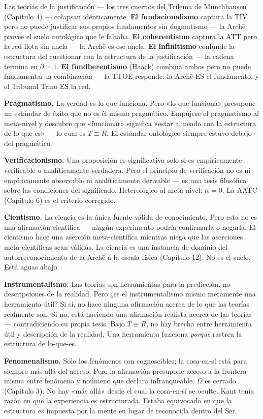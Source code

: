 \documentclass[10pt, openany, oneside]{book}
\begin{document}
Las teorías de la justificación --- los tres cuernos del Trilema de M\"{u}nchhausen (Capítulo 4) --- colapsan idénticamente. \textbf{El fundacionalismo} captura la TIV pero no puede justificar sus propios fundamentos sin dogmatismo --- la Arch\={e} provee el suelo autológico que le faltaba. \textbf{El coherentismo} captura la ATT pero la red flota sin ancla --- la Arch\={e} es ese ancla. \textbf{El infinitismo} confunde la estructura del cuestionar con la estructura de la justificación --- la cadena termina en $\partial = 1$. \textbf{El fundherentismo} (Haack) combina ambos pero no puede fundamentar la combinación --- la TTOE responde: la Arch\={e} ES el fundamento, y el Tribunal Trino ES la red.

\textbf{Pragmatismo.} La verdad es lo que funciona. Pero «lo que funciona» presupone un estándar de éxito que no es él mismo pragmático. Empújese el pragmatismo al meta-nivel y descubre que «funcionar» significa «estar alineado con la estructura de lo-que-es» --- lo cual es $T \equiv R$. El estándar ontológico siempre estuvo debajo del pragmático.

\textbf{Verificacionismo.} Una proposición es significativa solo si es empíricamente verificable o analíticamente verdadera. Pero el principio de verificación no es ni empíricamente observable ni analíticamente derivable --- es una tesis filosófica sobre las condiciones del significado. Heterológico al meta-nivel: $\alpha = 0$. La AATC (Capítulo 6) es el criterio corregido.

\textbf{Cientismo.} La ciencia es la única fuente válida de conocimiento. Pero esta no es una afirmación científica --- ningún experimento podría confirmarla o negarla. El cientismo hace una aserción meta-científica mientras niega que las aserciones meta-científicas sean válidas. La ciencia es una instancia de dominio del autorreconocimiento de la Arch\={e} a la escala física (Capítulo 12). No es el suelo. Está aguas abajo.

\textbf{Instrumentalismo.} Las teorías son herramientas para la predicción, no descripciones de la realidad. Pero ¿es el instrumentalismo mismo meramente una herramienta útil? Si sí, no hace ninguna afirmación acerca de lo que las teorías realmente son. Si no, está haciendo una afirmación realista acerca de las teorías --- contradiciendo su propia tesis. Bajo $T \equiv R$, no hay brecha entre herramienta útil y descripción de la realidad. Una herramienta funciona \textit{porque} rastrea la estructura de lo-que-es.

\textbf{Fenomenalismo.} Solo los fenómenos son cognoscibles; la cosa-en-sí está para siempre más allá del acceso. Pero la afirmación presupone acceso a la frontera misma entre fenómeno y noúmeno que declara infranqueable. $\Omega$ es cerrado (Capítulo 3). No hay «más allá» desde el cual la cosa-en-sí se oculte. Kant tenía razón en que la experiencia es estructurada. Estaba equivocado en que la estructura es impuesta por la mente en lugar de reconocida dentro del Ser.
\end{document}
